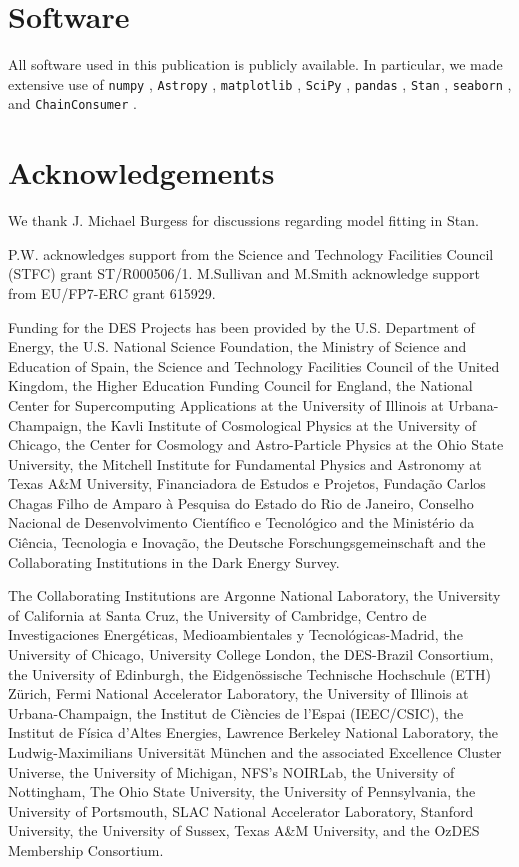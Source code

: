 \documentclass[fleqn,usenatbib]{mnras}
\begin{document}
\section*{Software}

All software used in this publication is publicly available. In particular, we made extensive use of \texttt{numpy} \citep{Harris2020}, \texttt{Astropy} \citep{AstropyCollaboration2013,AstropyCollaboration2018}, \texttt{matplotlib} \citep{Hunter2007}, \texttt{SciPy} \citep{Virtanen2020}, \texttt{pandas} \citep{Mckinney2010}, \texttt{Stan} \citep{Carpenter2017}, \texttt{seaborn} \citep{Waskom2020}, and \texttt{ChainConsumer} \citep{Hinton2016}.

\section*{Acknowledgements}
We thank J. Michael Burgess for discussions regarding model fitting in Stan.

 P.W. acknowledges support from the Science and Technology Facilities Council (STFC) grant ST/R000506/1. M.Sullivan and M.Smith acknowledge support from EU/FP7-ERC grant 615929. 

Funding for the DES Projects has been provided by the U.S. Department of Energy, the U.S. National Science Foundation, the Ministry of Science and Education of Spain, 
the Science and Technology Facilities Council of the United Kingdom, the Higher Education Funding Council for England, the National Center for Supercomputing 
Applications at the University of Illinois at Urbana-Champaign, the Kavli Institute of Cosmological Physics at the University of Chicago, 
the Center for Cosmology and Astro-Particle Physics at the Ohio State University,
the Mitchell Institute for Fundamental Physics and Astronomy at Texas A\&M University, Financiadora de Estudos e Projetos, 
Funda{\c c}{\~a}o Carlos Chagas Filho de Amparo {\`a} Pesquisa do Estado do Rio de Janeiro, Conselho Nacional de Desenvolvimento Cient{\'i}fico e Tecnol{\'o}gico and 
the Minist{\'e}rio da Ci{\^e}ncia, Tecnologia e Inova{\c c}{\~a}o, the Deutsche Forschungsgemeinschaft and the Collaborating Institutions in the Dark Energy Survey. 

The Collaborating Institutions are Argonne National Laboratory, the University of California at Santa Cruz, the University of Cambridge, Centro de Investigaciones Energ{\'e}ticas, 
Medioambientales y Tecnol{\'o}gicas-Madrid, the University of Chicago, University College London, the DES-Brazil Consortium, the University of Edinburgh, 
the Eidgen{\"o}ssische Technische Hochschule (ETH) Z{\"u}rich, 
Fermi National Accelerator Laboratory, the University of Illinois at Urbana-Champaign, the Institut de Ci{\`e}ncies de l'Espai (IEEC/CSIC), 
the Institut de F{\'i}sica d'Altes Energies, Lawrence Berkeley National Laboratory, the Ludwig-Maximilians Universit{\"a}t M{\"u}nchen and the associated Excellence Cluster Universe, 
the University of Michigan, NFS's NOIRLab, the University of Nottingham, The Ohio State University, the University of Pennsylvania, the University of Portsmouth, 
SLAC National Accelerator Laboratory, Stanford University, the University of Sussex, Texas A\&M University, and the OzDES Membership Consortium.
\end{document}
